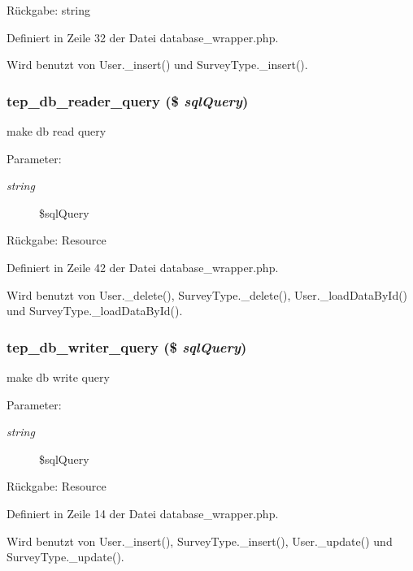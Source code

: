 \begin{Desc}
\item[Rückgabe:]string \end{Desc}


Definiert in Zeile 32 der Datei database\_\-wrapper.php.

Wird benutzt von User.\_\-insert() und SurveyType.\_\-insert().
\subsubsection{\setlength{\rightskip}{0pt plus 5cm}tep\_\-db\_\-reader\_\-query (\$ {\em sqlQuery})}\label{database__wrapper_8php_b8549d8a4736dd32c005b636a741f91b}


make db read query

\begin{Desc}
\item[Parameter:]
\begin{description}
\item[{\em string}]\$sqlQuery \end{description}
\end{Desc}
\begin{Desc}
\item[Rückgabe:]Resource \end{Desc}


Definiert in Zeile 42 der Datei database\_\-wrapper.php.

Wird benutzt von User.\_\-delete(), SurveyType.\_\-delete(), User.\_\-loadDataById() und SurveyType.\_\-loadDataById().
\subsubsection{\setlength{\rightskip}{0pt plus 5cm}tep\_\-db\_\-writer\_\-query (\$ {\em sqlQuery})}\label{database__wrapper_8php_7e851a57c051f87c2f623e41b8658d54}


make db write query

\begin{Desc}
\item[Parameter:]
\begin{description}
\item[{\em string}]\$sqlQuery \end{description}
\end{Desc}
\begin{Desc}
\item[Rückgabe:]Resource \end{Desc}


Definiert in Zeile 14 der Datei database\_\-wrapper.php.

Wird benutzt von User.\_\-insert(), SurveyType.\_\-insert(), User.\_\-update() und SurveyType.\_\-update().